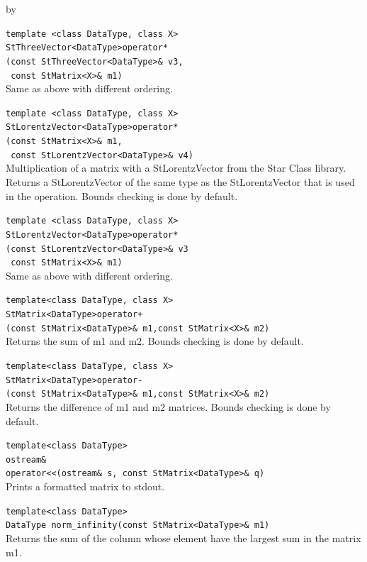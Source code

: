\documentclass[twoside]{article}
\newcommand{\entrylabel}[1]{\mbox{\textbf{{#1}}}\hfil}%
\newenvironment{entry}
{\begin{list}{}%
    {\renewcommand{\makelabel}{\entrylabel}%
     \setlength{\labelwidth}{90pt}%
     \setlength{\leftmargin}{\labelwidth}
     \advance\leftmargin by \labelsep%
      }%
    }%
  {\end{list}}
\newcommand{\Entrylabel}[1]%
{\raisebox{0pt}[1ex][0pt]{\makebox[\labelwidth][l]%
    {\parbox[t]{\labelwidth}{\hspace{0pt}\textbf{{#1}}}}}}
\newenvironment{Entry}%
{\renewcommand{\entrylabel}{\Entrylabel}\begin{entry}}%
  {\end{entry}}
\begin{document}
\begin{Entry}
  \verb+template <class DataType, class X>+\\
  \verb+StThreeVector<DataType>operator*+\\
  \verb+(const StThreeVector<DataType>& v3,+\\
  \verb+ const StMatrix<X>& m1)+\\
  Same as above with different ordering.
  
  \verb+template <class DataType, class X>+\\
  \verb+StLorentzVector<DataType>operator*+\\
  \verb+(const StMatrix<X>& m1,+\\
  \verb+ const StLorentzVector<DataType>& v4)+\\
  Multiplication of a matrix with a StLorentzVector from the
  Star Class library.  Returns a StLorentzVector of the
  same type as the StLorentzVector that is used in the operation.
  Bounds checking is done by default.

  \verb+template <class DataType, class X>+\\
  \verb+StLorentzVector<DataType>operator*+\\
  \verb+(const StLorentzVector<DataType>& v3+\\
  \verb+ const StMatrix<X>& m1)+\\
  Same as above with different ordering.

  \verb+template<class DataType, class X>+\\
  \verb#StMatrix<DataType>operator+#\\
  \verb#(const StMatrix<DataType>& m1,const StMatrix<X>& m2)#\\
  Returns the sum of m1 and m2.  Bounds checking is
  done by default.

  \verb+template<class DataType, class X>+\\
  \verb+StMatrix<DataType>operator-+\\
  \verb+(const StMatrix<DataType>& m1,const StMatrix<X>& m2)+\\
  Returns the difference of m1 and m2 matrices.  Bounds checking is
  done by default.

  \verb+template<class DataType>+\\
  \verb+ostream&+\\
  \verb+operator<<(ostream& s, const StMatrix<DataType>& q)+\\
  Prints a formatted matrix to stdout.

  \verb+template<class DataType>+\\
  \verb+DataType norm_infinity(const StMatrix<DataType>& m1)+\\
  Returns the sum of the column whose element have
  the largest sum in the matrix m1.


\end{Entry}
\end{document}
